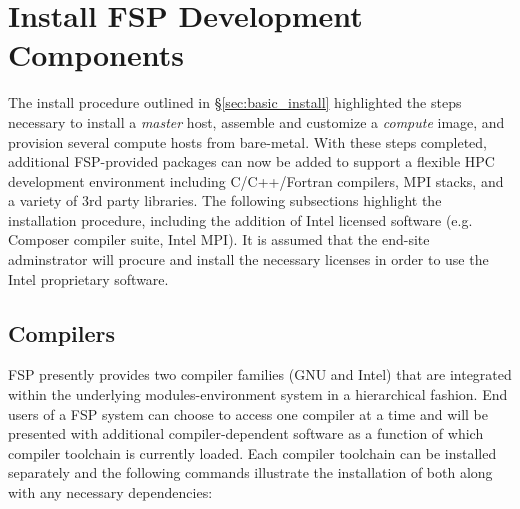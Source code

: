 \documentclass[letterpaper]{article}
\begin{document}

\section{Install FSP Development Components}

The install procedure outlined in \S\ref{sec:basic_install}
highlighted the steps necessary to install a {\em master} host,
assemble and customize a {\em compute} image, and provision several
compute hosts from bare-metal.  With these steps completed, 
additional FSP-provided packages can now be added to support a flexible HPC
development environment including C/C++/Fortran compilers, MPI stacks, and a
variety of 3rd party libraries. The following subsections highlight the
installation procedure, including the addition of Intel licensed software
(e.g. Composer compiler suite, Intel MPI). It is assumed that the end-site
adminstrator will procure and install the necessary licenses in order to use
the Intel proprietary software.

\subsection{Compilers}

FSP presently provides two compiler families ({GNU} and {Intel}) that are
integrated within the underlying modules-environment system in a hierarchical
fashion. End users of a FSP system can choose to access one compiler at a time
and will be presented with additional compiler-dependent software as a function
of which compiler toolchain is currently loaded. Each compiler toolchain can be
installed separately and the following commands illustrate the installation of
both along with any necessary dependencies:
\end{document}
